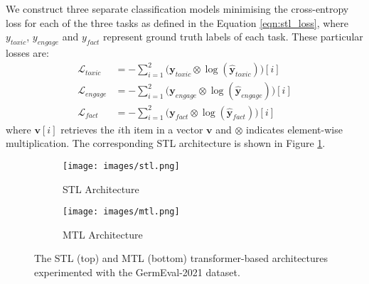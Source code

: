 \documentclass[11pt,a4paper]{article}
\begin{document}
We construct three separate classification models minimising the cross-entropy loss for each of the three tasks as defined in the Equation \ref{eqn:stl_loss}, where $y_{toxic}$, $y_{engage}$  and $y_{fact}$ represent ground truth labels of each task. These particular losses are:
\begin{align}
    \mathcal{L}_{toxic} &=-\sum^2_{i=1} \Big( \mathbf{y}_{toxic} \otimes \log( \hat{\mathbf{y}}_{toxic} ) \Big)[i] \nonumber \\
      \mathcal{L}_{engage} &=-\sum^2_{i=1} \Big( \mathbf{y}_{engage} \otimes \log( \hat{\mathbf{y}}_{engage} ) \Big)[i] \nonumber \\
       \mathcal{L}_{fact} &=-\sum^2_{i=1} \Big( \mathbf{y}_{fact} \otimes \log( \hat{\mathbf{y}}_{fact} ) \Big)[i]
\label{eqn:stl_loss}
\end{align}
where $\mathbf{v}[i]$ retrieves the $i$th item in a vector $\mathbf{v}$ and $\otimes$ indicates element-wise multiplication. The corresponding STL architecture is shown in Figure \ref{fig:stl}.

\begin{figure}[!ht]
\centering
  \begin{subfigure}[b]{6cm}
    \centering\texttt{[image: images/stl.png]}
    \caption{STL Architecture}
    \label{fig:stl}
  \end{subfigure}
    \begin{subfigure}[b]{6cm}
    \centering\texttt{[image: images/mtl.png]}
    \caption{MTL Architecture}
    \label{fig:mtl}
  \end{subfigure}
    
\caption{The STL (top) and MTL (bottom) transformer-based architectures experimented with the GermEval-2021 dataset.}
\label{fig:architecture}
\end{figure}
\end{document}

